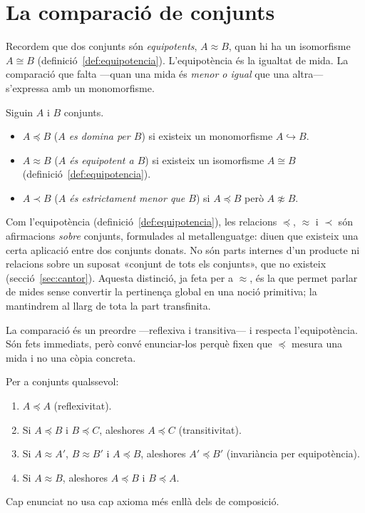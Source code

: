 \section{La comparació de conjunts}\label{sec:comparacio-conjunts}

Recordem que dos conjunts són \emph{equipotents}, \(A\approx B\), quan hi ha
un isomorfisme \(A\cong B\) (definició~\ref{def:equipotencia}). L'equipotència
és la igualtat de mida. La comparació que falta ---quan una mida és
\emph{menor o igual} que una altra--- s'expressa amb un monomorfisme.

\begin{definicio}\label{def:comparacio}
Siguin \(A\) i \(B\) conjunts.
\begin{itemize}
\item \(A\preceq B\) (\emph{\(A\) es domina per \(B\)}) si existeix un
monomorfisme \(A\hookrightarrow B\).
\item \(A\approx B\) (\emph{\(A\) és equipotent a \(B\)}) si existeix un
isomorfisme \(A\cong B\) (definició~\ref{def:equipotencia}).
\item \(A\prec B\) (\emph{\(A\) és estrictament menor que \(B\)}) si
\(A\preceq B\) però \(A\not\approx B\).
\end{itemize}
\end{definicio}

\begin{observacio}\label{obs:comparacio-metateoria}
Com l'equipotència (definició~\ref{def:equipotencia}), les relacions
\(\preceq\), \(\approx\) i \(\prec\) són afirmacions \emph{sobre} conjunts,
formulades al metallenguatge: diuen que existeix una certa aplicació entre
dos conjunts donats. No són parts internes d'un producte ni relacions sobre
un suposat «conjunt de tots els conjunts», que no existeix
(secció~\ref{sec:cantor}). Aquesta distinció, ja feta per a \(\approx\), és
la que permet parlar de mides sense convertir la pertinença global en una
noció primitiva; la mantindrem al llarg de tota la part transfinita.
\end{observacio}

La comparació és un preordre ---reflexiva i transitiva--- i respecta
l'equipotència. Són fets immediats, però convé enunciar-los perquè fixen que
\(\preceq\) mesura una mida i no una còpia concreta.

\begin{proposicio}\label{prop:preceq-preordre}
Per a conjunts qualssevol:
\begin{enumerate}
\item \(A\preceq A\) (reflexivitat).
\item Si \(A\preceq B\) i \(B\preceq C\), aleshores \(A\preceq C\)
(transitivitat).
\item Si \(A\approx A'\), \(B\approx B'\) i \(A\preceq B\), aleshores
\(A'\preceq B'\) (invariància per equipotència).
\item Si \(A\approx B\), aleshores \(A\preceq B\) i \(B\preceq A\).
\end{enumerate}
Cap enunciat no usa cap axioma més enllà dels de composició.
\end{proposicio}

